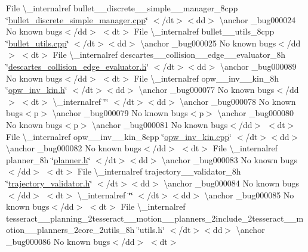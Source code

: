 \begin{DoxyRefList}
\+File \textbackslash{}\+\_\+internalref bullet\+\_\+\+\_\+discrete\+\_\+\+\_\+simple\+\_\+\+\_\+manager\+\_\+8cpp \char`\"{}\mbox{\hyperlink{bullet__discrete__simple__manager_8cpp}{bullet\+\_\+discrete\+\_\+simple\+\_\+manager.\+cpp}}\char`\"{} $<$/dt$>$$<$dd$>$ \textbackslash{}anchor \+\_\+bug000024 No known bugs$<$/dd$>$ $<$dt$>$
\+File \textbackslash{}\+\_\+internalref bullet\+\_\+\+\_\+utils\+\_\+8cpp \char`\"{}\mbox{\hyperlink{bullet__utils_8cpp}{bullet\+\_\+utils.\+cpp}}\char`\"{} $<$/dt$>$$<$dd$>$ \textbackslash{}anchor \+\_\+bug000025 No known bugs$<$/dd$>$ $<$dt$>$
\+File \textbackslash{}\+\_\+internalref descartes\+\_\+\+\_\+collision\+\_\+\+\_\+edge\+\_\+\+\_\+evaluator\+\_\+8h \char`\"{}\mbox{\hyperlink{descartes__collision__edge__evaluator_8h}{descartes\+\_\+collision\+\_\+edge\+\_\+evaluator.\+h}}\char`\"{} $<$/dt$>$$<$dd$>$ \textbackslash{}anchor \+\_\+bug000089 No known bugs$<$/dd$>$ $<$dt$>$
\+File \textbackslash{}\+\_\+internalref opw\+\_\+\+\_\+inv\+\_\+\+\_\+kin\+\_\+8h \char`\"{}\mbox{\hyperlink{opw__inv__kin_8h}{opw\+\_\+inv\+\_\+kin.\+h}}\char`\"{} $<$/dt$>$$<$dd$>$ \textbackslash{}anchor \+\_\+bug000077 No known bugs$<$/dd$>$ $<$dt$>$
 \textbackslash{}\+\_\+internalref  \char`\"{}\char`\"{} $<$/dt$>$$<$dd$>$ \textbackslash{}anchor \+\_\+bug000078 No known bugs$<$p$>$ \textbackslash{}anchor \+\_\+bug000079 No known bugs$<$p$>$ \textbackslash{}anchor \+\_\+bug000080 No known bugs$<$p$>$ \textbackslash{}anchor \+\_\+bug000081 No known bugs$<$/dd$>$ $<$dt$>$
\+File \textbackslash{}\+\_\+internalref opw\+\_\+\+\_\+inv\+\_\+\+\_\+kin\+\_\+8cpp \char`\"{}\mbox{\hyperlink{opw__inv__kin_8cpp}{opw\+\_\+inv\+\_\+kin.\+cpp}}\char`\"{} $<$/dt$>$$<$dd$>$ \textbackslash{}anchor \+\_\+bug000082 No known bugs$<$/dd$>$ $<$dt$>$
\+File \textbackslash{}\+\_\+internalref planner\+\_\+8h \char`\"{}\mbox{\hyperlink{planner_8h}{planner.\+h}}\char`\"{} $<$/dt$>$$<$dd$>$ \textbackslash{}anchor \+\_\+bug000083 No known bugs$<$/dd$>$ $<$dt$>$
\+File \textbackslash{}\+\_\+internalref trajectory\+\_\+\+\_\+validator\+\_\+8h \char`\"{}\mbox{\hyperlink{trajectory__validator_8h}{trajectory\+\_\+validator.\+h}}\char`\"{} $<$/dt$>$$<$dd$>$ \textbackslash{}anchor \+\_\+bug000084 No known bugs$<$/dd$>$ $<$dt$>$
 \textbackslash{}\+\_\+internalref  \char`\"{}\char`\"{} $<$/dt$>$$<$dd$>$ \textbackslash{}anchor \+\_\+bug000085 No known bugs$<$/dd$>$ $<$dt$>$
\+File \textbackslash{}\+\_\+internalref tesseract\+\_\+\+\_\+planning\+\_\+2tesseract\+\_\+\+\_\+motion\+\_\+\+\_\+planners\+\_\+2include\+\_\+2tesseract\+\_\+\+\_\+motion\+\_\+\+\_\+planners\+\_\+2core\+\_\+2utils\+\_\+8h \char`\"{}utils.\+h\char`\"{} $<$/dt$>$$<$dd$>$ \textbackslash{}anchor \+\_\+bug000086 No known bugs$<$/dd$>$ $<$dt$>$

\end{DoxyRefList}
